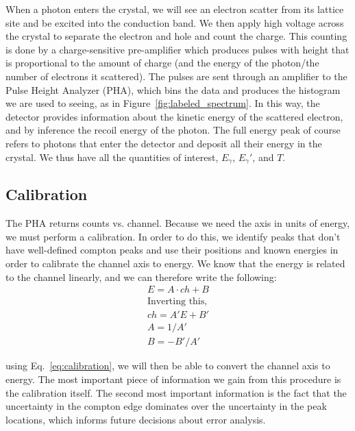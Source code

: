 \documentclass[reprint, nobibnotes, amssymb, amsmath, amsfonts, physics, mathtools, mathrsfs, floatfix]{revtex4-1}
\begin{document}
    \hspace{.25cm}

    When a photon enters the crystal, we will see an electron scatter from its lattice site and be excited into the conduction band.  We then apply high voltage across the crystal to separate the electron and hole and count the charge.  This counting is done by a charge-sensitive pre-amplifier which produces pulses with height that is proportional to the amount of charge (and the energy of the photon/the number of electrons it scattered).  The pulses are sent through an amplifier to the Pulse Height Analyzer (PHA), which bins the data and produces the histogram we are used to seeing, as in Figure~\ref{fig:labeled_spectrum}.  In this way, the detector provides information about the kinetic energy of the scattered electron, and by inference the recoil energy of the photon.  The full energy peak of course refers to photons that enter the detector and deposit all their energy in the crystal.  We thus have all the quantities of interest, $E_\gamma$, $E_\gamma'$, and $T$.

    \subsection{Calibration}
      The PHA returns counts vs. channel.  Because we need the axis in units of energy, we must perform a calibration.  In order to do this, we identify peaks that don't have well-defined compton peaks and use their positions and known energies in order to calibrate the channel axis to energy.  We know that the energy is related to the channel linearly, and we can therefore write the following:
      \begin{gather}
        E = A \cdot ch + B \label{eq:calibration}\\
        \text{Inverting this,}\nonumber \\
        ch = A'E + B' \\
        A = 1/A' \\
        B = -B'/A'
      \end{gather}

      using Eq.~\ref{eq:calibration}, we will then be able to convert the channel axis to energy.  The most important piece of information we gain from this procedure is the calibration itself.  The second most important information is the fact that the uncertainty in the compton edge dominates over the uncertainty in the peak locations, which informs future decisions about error analysis.
\end{document}
